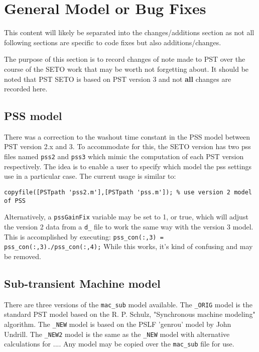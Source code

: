 \chapter{General Model or Bug Fixes}

This content will likely be separated into the changes/additions section as not all following sections are specific to code fixes but also additions/changes.

The purpose of this section is to record changes of note made to PST over the course of the SETO work that may be worth not forgetting about.
It should be noted that PST SETO is based on PST version 3 and not \textbf{all} changes are recorded here.

\section{PSS model}  
There was a correction to the washout time constant in the PSS model between PST version 2.x and 3.
To accommodate for this, the SETO version has two pss files named \verb|pss2| and \verb|pss3| which mimic the computation of each PST version respectively.
The idea is to enable a user to specify which model the pss settings use in a particular case.
The current usage is similar to:
\begin{verbatim}
copyfile([PSTpath 'pss2.m'],[PSTpath 'pss.m']); % use version 2 model of PSS
\end{verbatim}

Alternatively, a \verb|pssGainFix| variable may be set to 1, or true, which will adjust the version 2 data from a \verb|d_| file to work the same way with the version 3 model.
This is accomplished by executing: \verb|pss_con(:,3) = pss_con(:,3)./pss_con(:,4);|
While this works, it's kind of confusing and may be removed.

\section{Sub-transient Machine model}  
There are three versions of the \verb|mac_sub| model available.
The \verb|_ORIG| model is the standard PST model based on the R. P. Schulz, "Synchronous machine modeling" algorithm.
The \verb|_NEW| model is based on the PSLF 'genrou' model by John Undrill.
The \verb|_NEW2| model is the same as the \verb|_NEW| model with alternative calculations for ....
Any model may be copied over the \verb|mac_sub| file for use.

